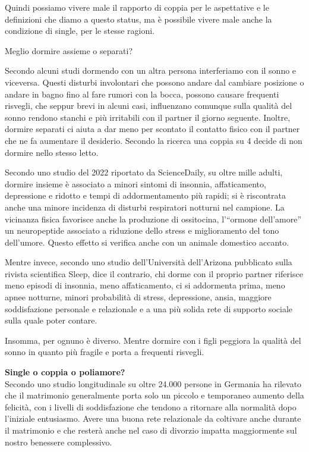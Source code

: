 \documentclass[12pt]{book} %
\begin{document}
Quindi possiamo vivere male il rapporto di coppia per le aspettative e le definizioni che diamo a questo status, ma è
possibile vivere male anche la condizione di single, per le stesse ragioni.

\begin{mdframed}[linewidth=1pt]
Meglio dormire assieme o separati? 

Secondo alcuni studi dormendo con un altra persona interferiamo con il sonno e viceversa. Questi
disturbi involontari che possono andare dal cambiare posizione o andare in bagno fino al fare rumori con la bocca,
possono causare frequenti risvegli, che seppur brevi in alcuni casi, influenzano comunque sulla qualità del sonno rendono
stanchi e più irritabili con il partner il giorno seguente. Inoltre, dormire separati ci aiuta a dar meno per scontato
il contatto fisico con il partner che ne fa aumentare il desiderio. Secondo la ricerca una coppia su 4 decide di non
dormire nello stesso letto.

Secondo uno studio del 2022 riportato da ScienceDaily, su oltre mille adulti, dormire insieme è associato a minori sintomi di insonnia, affaticamento, depressione e ridotto e tempi di addormentamento più rapidi; si è riscontrata anche una minore incidenza di disturbi respiratori notturni nel campione. La vicinanza fisica favorisce anche la produzione di ossitocina, l'“ormone dell'amore” un neuropeptide associato a riduzione dello stress e miglioramento del tono dell’umore. Questo effetto si verifica anche con un animale domestico accanto.

Mentre invece, secondo uno studio dell'Università dell'Arizona pubblicato sulla rivista scientifica
Sleep, dice il contrario, chi
dorme con il proprio partner riferisce meno episodi di insonnia, meno affaticamento, ci si addormenta prima, meno apnee
notturne, minori probabilità di stress, depressione, ansia, maggiore soddisfazione personale e relazionale e a una più
solida rete di supporto sociale sulla quale poter contare. 

Insomma, per ognuno è diverso. Mentre dormire con i figli peggiora la qualità del sonno in quanto più fragile e porta a frequenti risvegli.
\end{mdframed}

\noindent \textbf{\large Single o coppia o poliamore?} \\
Secondo uno studio longitudinale su oltre 24.000 persone in Germania ha rilevato che il matrimonio generalmente porta solo un piccolo e temporaneo aumento della felicità, con i livelli di soddisfazione che tendono a ritornare alla normalità dopo l'iniziale entusiasmo. Avere una buona rete relazionale da coltivare anche durante il matrimonio e che resterà anche nel caso di divorzio impatta maggiormente sul nostro benessere complessivo.
\end{document}
